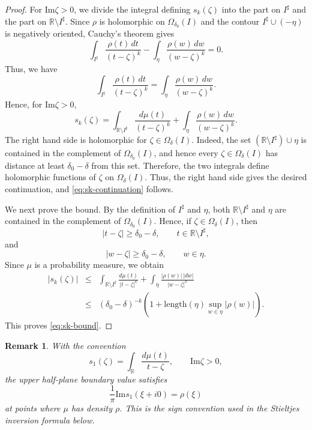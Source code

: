 \documentclass[a4paper,11pt]{article}
\newtheorem{rem}[thm]{Remark}
\newcommand{\Impart}{\mathrm{Im}}
\newcommand{\length}{\mathrm{length}}
\begin{document}
\begin{proof}
For $\Impart \zeta>0$, we divide the integral defining $s_k(\zeta)$
into the part on $I^{\sharp}$ and the part on
$\mathbb R\setminus I^{\sharp}$. 
Since $\rho$ is holomorphic on $\Omega_{\delta_0}(I)$ and the contour
$I^\sharp\cup(-\eta)$ is negatively oriented, Cauchy's theorem gives
$$
\int_{I^\sharp}\frac{\rho(t)\,dt}{(t-\zeta)^k}
-\int_{\eta}\frac{\rho(w)\,dw}{(w-\zeta)^k}=0.
$$
Thus, we have
$$
\int_{I^\sharp}\frac{\rho(t)\,dt}{(t-\zeta)^k}
=
\int_{\eta}\frac{\rho(w)\,dw}{(w-\zeta)^k}.
$$
Hence, for $\Impart \zeta>0$,
$$
s_k(\zeta)
=
\int_{\mathbb R\setminus I^{\sharp}}
\frac{d\mu(t)}{(t-\zeta)^k}
+
\int_{\eta}\frac{\rho(w)\,dw}{(w-\zeta)^k}.
$$
The right hand side is holomorphic for $\zeta\in\Omega_\delta(I)$.
Indeed, the set $(\mathbb R\setminus I^\sharp)\cup\eta$ is contained in
the complement of $\Omega_{\delta_0}(I)$, and hence every
$\zeta\in\Omega_\delta(I)$ has distance at least $\delta_0-\delta$ from this set. 
Therefore, the two integrals define holomorphic functions of
$\zeta$ on $\Omega_\delta(I)$. 
Thus, the right hand side gives the desired continuation, and \eqref{eq:sk-continuation} follows.

We next prove the bound.
By the definition of $I^\sharp$ and $\eta$,
both $\mathbb R\setminus I^\sharp$ and $\eta$ are contained in the
complement of $\Omega_{\delta_0}(I)$.
Hence, if $\zeta\in\Omega_\delta(I)$, then
$$
|t-\zeta|\ge \delta_0-\delta,
\qquad
t\in\mathbb R\setminus I^\sharp,
$$
and
$$
|w-\zeta|\ge \delta_0-\delta,
\qquad
w\in\eta.
$$
Since $\mu$ is a probability measure, we obtain
\begin{eqnarray}
|s_k(\zeta)|
&\le&
\int_{\mathbb R\setminus I^{\sharp}}
\frac{d\mu(t)}{|t-\zeta|^k}
+
\int_{\eta}\frac{|\rho(w)|\,|dw|}{|w-\zeta|^k}
\nonumber\\
&\le&
(\delta_0-\delta)^{-k}
\left(
1+\length(\eta)\sup_{w\in\eta}|\rho(w)|
\right).
\label{eq:sk-bound-proof}
\end{eqnarray}
This proves \eqref{eq:sk-bound}.
\end{proof}

\begin{rem}
With the convention
$$
s_1(\zeta)
=
\int_{\mathbb R}\frac{d\mu(t)}{t-\zeta},
\qquad
\Impart\zeta>0,
$$
the upper half-plane boundary value satisfies
$$
\frac{1}{\pi}\Impart s_1(\xi+i0)=\rho(\xi)
$$
at points where $\mu$ has density $\rho$. 
This is the sign convention used in the Stieltjes inversion formula below.
\end{rem}
\end{document}
